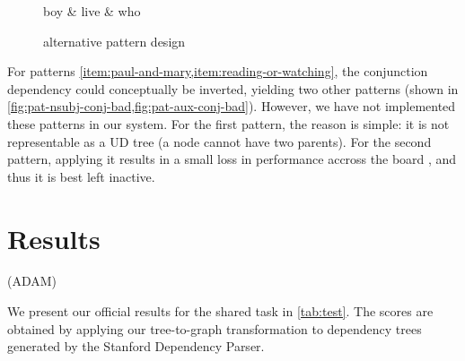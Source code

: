 \documentclass[11pt,a4paper]{article}
\begin{document}
\begin{figure}[h]
    \centering
    \begin{dependency}
    \begin{deptext}[column sep=0.5cm]
    boy \& live \& who  \\
    \end{deptext}
    \end{dependency}
    \caption{alternative pattern design}
    \label{fig:alt-p}
\end{figure}
    

For patterns \cref{item:paul-and-mary,item:reading-or-watching}, the
conjunction dependency could conceptually be inverted, yielding two
other patterns (shown in
\cref{fig:pat-nsubj-conj-bad,fig:pat-aux-conj-bad}). However, we have
not implemented these patterns in our system. For the first pattern,
the reason is simple: it is not representable as a UD tree (a node
cannot have two parents). For the second pattern, applying it
results in a small loss in performance accross the board , and thus it is best left inactive.

\section{Results}
(ADAM)

We present our official results for the shared task in
\cref{tab:test}. The scores are obtained by applying our tree-to-graph
transformation to dependency trees generated by the Stanford
Dependency Parser.
\end{document}
